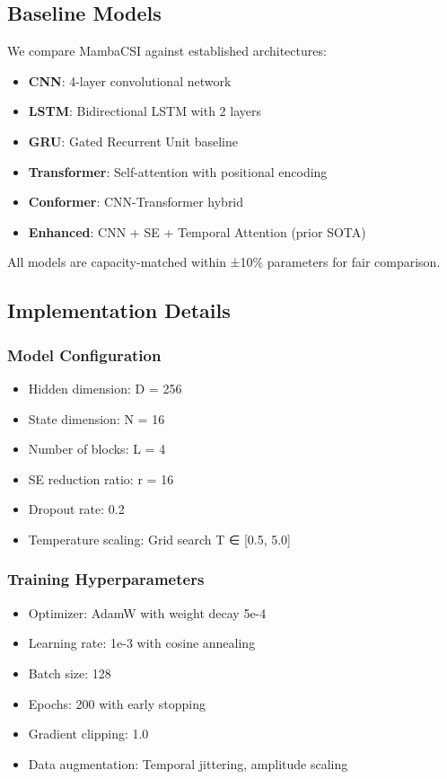 \documentclass[journal]{IEEEtran}
\begin{document}
\subsection{Baseline Models}

We compare MambaCSI against established architectures:
\begin{itemize}
\item \textbf{CNN}: 4-layer convolutional network
\item \textbf{LSTM}: Bidirectional LSTM with 2 layers
\item \textbf{GRU}: Gated Recurrent Unit baseline
\item \textbf{Transformer}: Self-attention with positional encoding
\item \textbf{Conformer}: CNN-Transformer hybrid
\item \textbf{Enhanced}: CNN + SE + Temporal Attention (prior SOTA)
\end{itemize}

All models are capacity-matched within ±10\% parameters for fair comparison.

\subsection{Implementation Details}

\subsubsection{Model Configuration}
\begin{itemize}
\item Hidden dimension: D = 256
\item State dimension: N = 16  
\item Number of blocks: L = 4
\item SE reduction ratio: r = 16
\item Dropout rate: 0.2
\item Temperature scaling: Grid search T ∈ [0.5, 5.0]
\end{itemize}

\subsubsection{Training Hyperparameters}
\begin{itemize}
\item Optimizer: AdamW with weight decay 5e-4
\item Learning rate: 1e-3 with cosine annealing
\item Batch size: 128
\item Epochs: 200 with early stopping
\item Gradient clipping: 1.0
\item Data augmentation: Temporal jittering, amplitude scaling
\end{itemize}
\end{document}
